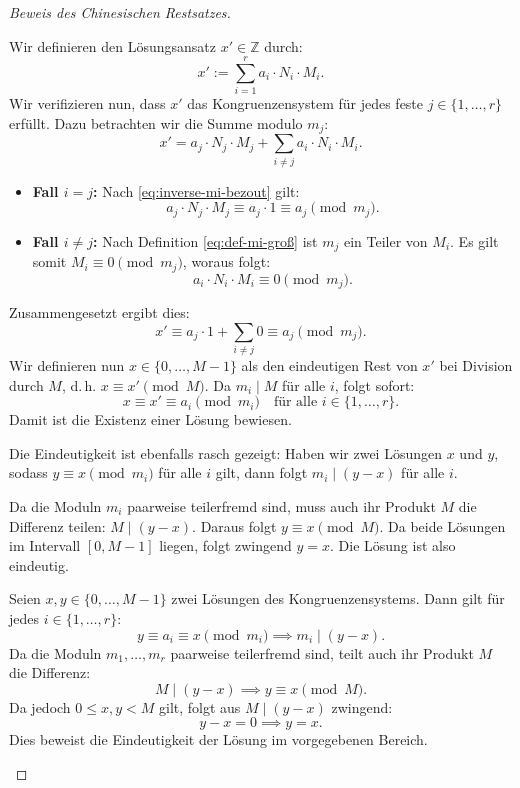 \begin{proof}[Beweis des Chinesischen Restsatzes]
\begin{math-stroke}
Wir definieren den Lösungsansatz $x' \in \mathbb{Z}$ durch:
\begin{equation}\label{eq:loesungsansatz-x-strich}
x' := \sum_{i=1}^r a_i \cdot N_i \cdot M_i.
\end{equation}
Wir verifizieren nun, dass $x'$ das Kongruenzensystem für jedes feste $j \in \{1, \dots, r\}$ erfüllt. Dazu betrachten wir die Summe modulo $m_j$:
\[
x' = a_j \cdot N_j \cdot M_j + \sum_{i \neq j} a_i \cdot N_i \cdot M_i.
\]
\begin{itemize}
    \item \textbf{Fall $i = j$:} Nach \eqref{eq:inverse-mi-bezout} gilt:
    \[
    a_j \cdot N_j \cdot M_j \equiv a_j \cdot 1 \equiv a_j \pmod{m_j}.
    \]
    \item \textbf{Fall $i \neq j$:} Nach Definition \eqref{eq:def-mi-groß} ist $m_j$ ein Teiler von $M_i$. Es gilt somit $M_i \equiv 0 \pmod{m_j}$, woraus folgt:
    \[
    a_i \cdot N_i \cdot M_i \equiv 0 \pmod{m_j}.
    \]
\end{itemize}
Zusammengesetzt ergibt dies:
\[
x' \equiv a_j \cdot 1 + \sum_{i \neq j} 0 \equiv a_j \pmod{m_j}.
\]
Wir definieren nun $x \in \{0, \dots, M-1\}$ als den eindeutigen Rest von $x'$ bei Division durch $M$, d.\,h. $x \equiv x' \pmod M$. Da $m_i \mid M$ für alle $i$, folgt sofort:
\[
x \equiv x' \equiv a_i \pmod{m_i} \quad \text{für alle } i \in \{1, \dots, r\}.
\]
Damit ist die Existenz einer Lösung bewiesen.
\end{math-stroke}

\begin{spoken-clean}[01:12:39 - 01:15:55]
Die Eindeutigkeit ist ebenfalls rasch gezeigt: Haben wir zwei Lösungen $x$ und $y$, sodass $y \equiv x \pmod{m_i}$ für alle $i$ gilt, dann folgt $m_i \mid (y - x)$ für alle $i$.

Da die Moduln $m_i$ paarweise teilerfremd sind, muss auch ihr Produkt $M$ die Differenz teilen: $M \mid (y - x)$. Daraus folgt $y \equiv x \pmod M$. Da beide Lösungen im Intervall $[0, M-1]$ liegen, folgt zwingend $y = x$. Die Lösung ist also eindeutig. 
\end{spoken-clean}

\begin{math-stroke}
Seien $x, y \in \{0, \dots, M-1\}$ zwei Lösungen des Kongruenzensystems. Dann gilt für jedes $i \in \{1, \dots, r\}$:
\[
y \equiv a_i \equiv x \pmod{m_i} \implies m_i \mid (y - x).
\]
Da die Moduln $m_1, \dots, m_r$ paarweise teilerfremd sind, teilt auch ihr Produkt $M$ die Differenz:
\[
M \mid (y - x) \implies y \equiv x \pmod M.
\]
Da jedoch $0 \le x, y < M$ gilt, folgt aus $M \mid (y - x)$ zwingend:
\[
y - x = 0 \implies y = x.
\]
Dies beweist die Eindeutigkeit der Lösung im vorgegebenen Bereich.
\end{math-stroke}
\end{proof}

